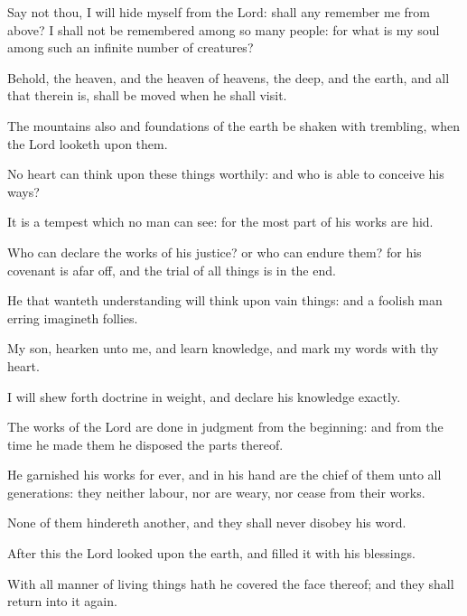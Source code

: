 {\par }{\PP {}Say not thou, I will hide myself from the Lord: shall any remember me from above? I shall not be remembered among so many people: for what is my soul among such an infinite number of creatures?
\par }{\PP {}Behold, the heaven, and the heaven of heavens, the deep, and the earth, and all that therein is, shall be moved when he shall visit.
\par }{\PP {}The mountains also and foundations of the earth be shaken with trembling, when the Lord looketh upon them.
\par }{\PP {}No heart can think upon these things worthily: and who is able to conceive his ways?
\par }{\PP {}It is a tempest which no man can see: for the most part of his works are hid.
\par }{\PP {}Who can declare the works of his justice? or who can endure them? for his covenant is afar off, and the trial of all things is in the end.
\par }{\PP {}He that wanteth understanding will think upon vain things: and a foolish man erring imagineth follies.
\par }{\PP {}My son, hearken unto me, and learn knowledge, and mark my words with thy heart.
\par }{\PP {}I will shew forth doctrine in weight, and declare his knowledge exactly.
\par }{\PP {}The works of the Lord are done in judgment from the beginning: and from the time he made them he disposed the parts thereof.
\par }{\PP {}He garnished his works for ever, and in his hand are the chief of them unto all generations: they neither labour, nor are weary, nor cease from their works.
\par }{\PP {}None of them hindereth another, and they shall never disobey his word.
\par }{\PP {}After this the Lord looked upon the earth, and filled it with his blessings.
\par }{\PP {}With all manner of living things hath he covered the face thereof; and they shall return into it again.

}

